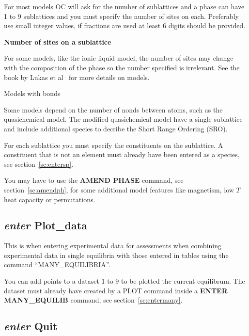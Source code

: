 \documentclass[11pt]{article}
\begin{document}
For most models OC will ask for the number of sublattices and a phase
can have 1 to 9 sublattices and you must specify the number of sites
on each.  Preferably use small integer values, if fractions are used
at least 6 digits should be provided.

\hypertarget{Enter phase sites}{{\bf Number of sites on a sublattice }}

For some models, like the ionic liquid model, the number of sites may
change with the composition of the phase so the number specified is
irrelevant.  See the book by Lukas et al~\cite{07Luk} for more details
on models.

\hypertarget{Enter phase bonds}{Models with bonds}

Some models depend on the number of nonds between atoms, such as the
quasichemical model.  The modified quasichemical model have a single
sublattice and include additional species to decribe the Short Range
Ordering (SRO).


\hypertarget{Enter phase constituents}{}

For each sublattice you must specify the constituents on the
sublattice.  A constituent that is not an element must already have
been entered as a species, see section~\ref{sc:entersp}.

You may have to use the {\bf AMEND PHASE} command, see
section~\ref{sc:amendph}, for some additional model features like
magnetism, low $T$ heat capacity or permutations.

\hypertarget{Enter plot data}{}
\subsection{{\em enter} Plot\_data}

This is when entering experimental data for assessments when combining
experimental data in single equilibria with those entered in tables
using the command ``MANY\_EQUILIBRIA''.

You can add points to a dataset 1 to 9 to be plotted the current
equilibrum.  The dataset must already have created by a PLOT command
inside a {\bf ENTER MANY\_EQUILIB} command, see
section~\ref{sc:entermany}.

\hypertarget{Enter quit}{}
\subsection{{\em enter} Quit}
\end{document}
